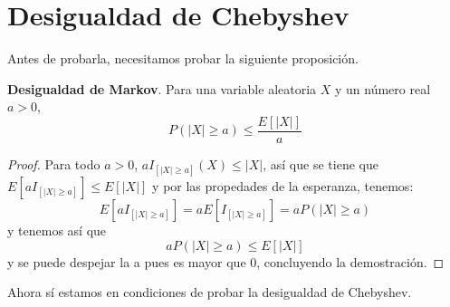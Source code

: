 \section{Desigualdad de Chebyshev}\label{st:Cheby}
Antes de probarla, necesitamos probar la siguiente proposición.
\begin{proposicion}
\textbf{Desigualdad de Markov}. Para una variable aleatoria $X$ y un número real $a>0$,
\[ P(\vert X \vert \geq a) \leq \frac{E \left[ \vert X \vert \right]}{a} \]
\end{proposicion}
\begin{proof}
Para todo $a>0$, $aI_{[ \vert X \vert  \geq a]}(X) \leq \vert X \vert$, así que se tiene que $E[aI_{[ \vert X \vert  \geq a]}] \leq E[\vert X \vert]$ y por las propedades de la esperanza, tenemos:
\[ E[aI_{[ \vert X \vert  \geq a]}] = aE[I_{[ \vert X \vert  \geq a]}] = aP(\vert X \vert \geq a) \] y tenemos así que
\[ aP(\vert X \vert \geq a) \leq E \left[ \vert X \vert \right] \]
y se puede despejar la a pues es mayor que 0, concluyendo la demostración.
\end{proof}
Ahora sí estamos en condiciones de probar la desigualdad de Chebyshev.
\begin{proposicion}

\end{proposicion}
\cite{forsyth2018probability}
\endinput










